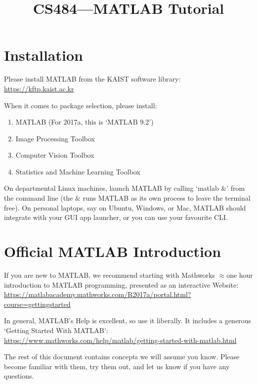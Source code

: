 \documentclass{article}
\date{}
\title{CS484---MATLAB Tutorial}
\begin{document}
\maketitle
\vspace{-2cm}
\thispagestyle{fancy}

\section{Installation}

Please install MATLAB from the KAIST software library:\\ \href{https://kftp.kaist.ac.kr}{https://kftp.kaist.ac.kr}

When it comes to package selection, please install:
\begin{enumerate}
    \item MATLAB (For 2017a, this is `MATLAB 9.2')
    \item Image Processing Toolbox
    \item Computer Vision Toolbox
    \item Statistics and Machine Learning Toolbox
\end{enumerate}

On departmental Linux machines, launch MATLAB by calling `matlab \&' from the command line (the \& runs MATLAB as its own process to leave the terminal free). On personal laptops, say on Ubuntu, Windows, or Mac, MATLAB should integrate with your GUI app launcher, or you can use your favourite CLI.

\section{Official MATLAB Introduction}

If you are new to MATLAB, we recommend starting with Mathworks $\approx$one hour introduction to MATLAB programming, presented as an interactive Website:\\
\href{https://matlabacademy.mathworks.com/R2017a/portal.html?course=gettingstarted}{https://matlabacademy.mathworks.com/R2017a/portal.html?course=gettingstarted}

In general, MATLAB's Help is excellent, so use it liberally. It includes a generous `Getting Started With MATLAB':\\
\href{https://www.mathworks.com/help/matlab/getting-started-with-matlab.html}{https://www.mathworks.com/help/matlab/getting-started-with-matlab.html}

The rest of this document contains concepts we will assume you know. Please become familiar with them, try them out, and let us know if you have any questions.
\end{document}
